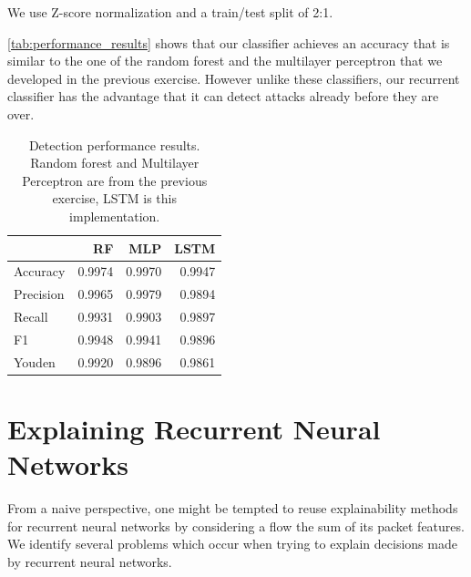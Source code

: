 \documentclass[sigconf,nonacm]{acmart}
\begin{document}
We use Z-score normalization and a train/test split of 2:1.

\autoref{tab:performance_results} shows that our classifier achieves an accuracy that is similar to the one of the random forest and the multilayer perceptron that we developed in the previous exercise. However unlike these classifiers, our recurrent classifier has the advantage that it can detect attacks already before they are over.

\begin{table}
\caption{Detection performance results. Random forest and Multilayer Perceptron are from the previous exercise, LSTM is this implementation.} \label{tab:performance_results}
\begin{tabular}{l r r r} \toprule
& RF & MLP & LSTM \\ \midrule
Accuracy	&	0.9974 & 0.9970	& 0.9947 \\
Precision	&	0.9965 & 0.9979 & 0.9894	\\
Recall	&	0.9931 & 0.9903	& 0.9897 \\
F1	&	0.9948 & 0.9941	& 0.9896 \\
Youden	&	0.9920 & 0.9896 & 0.9861 \\
\bottomrule
\end{tabular}
\end{table}

\section{Explaining Recurrent Neural Networks}
From a naive perspective, one might be tempted to reuse explainability methods for recurrent neural networks by considering a flow the sum of its packet features.
We identify several problems which occur when trying to explain decisions made by recurrent neural networks.
\end{document}
